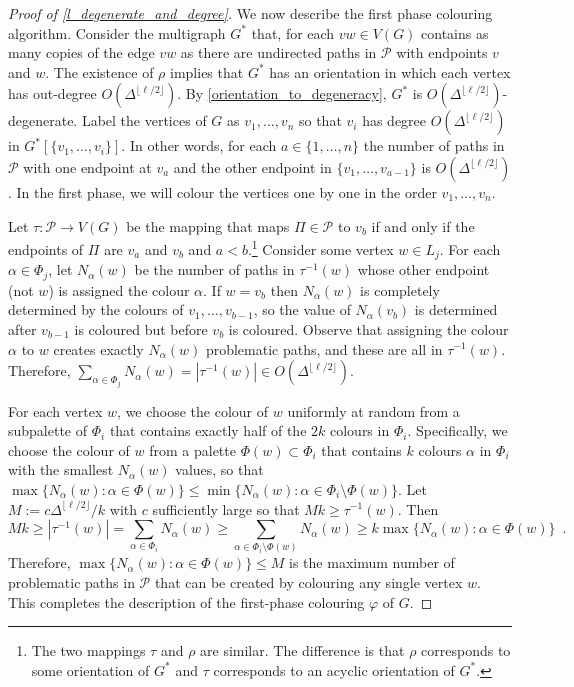 \documentclass{patmorin}
\begin{document}
\begin{proof}[Proof of \cref{l_degenerate_and_degree}]
  We now describe the first phase colouring algorithm.  Consider the multigraph $G^*$ that, for each $vw\in V(G)$ contains as many copies of the edge $vw$ as there are undirected paths in $\mathcal{P}$ with endpoints $v$ and $w$.  The existence of $\rho$ implies that $G^*$ has an orientation in which each vertex has out-degree $O(\Delta^{\lfloor\ell /2\rfloor})$.  By \cref{orientation_to_degeneracy}, $G^*$ is $O(\Delta^{\lfloor\ell /2\rfloor})$-degenerate.  Label the vertices of $G$ as $v_1,\ldots,v_n$ so that $v_i$ has degree $O(\Delta^{\lfloor\ell /2\rfloor})$ in $G^*[\{v_1,\ldots,v_{i}\}]$. In other words, for each $a\in\{1,\ldots,n\}$ the number of paths in $\mathcal{P}$ with one endpoint at $v_a$ and the other endpoint in $\{v_1,\ldots,v_{a-1}\}$ is $O(\Delta^{\lfloor\ell /2\rfloor})$.  In the first phase, we will colour the vertices one by one in the order $v_1,\ldots,v_n$.

  Let $\tau:\mathcal{P}\to V(G)$ be the mapping that maps $\Pi\in\mathcal{P}$ to $v_b$ if and only if the endpoints of $\Pi$ are $v_a$ and $v_b$ and $a < b$.\footnote{The two mappings $\tau$ and $\rho$ are similar. The difference is that $\rho$ corresponds to some orientation of $G^*$ and $\tau$ corresponds to an acyclic orientation of $G^*$.}  Consider some vertex $w\in L_j$.  For each $\alpha \in \Phi_j$, let $N_{\alpha}(w)$ be the number of paths in $\tau^{-1}(w)$ whose other endpoint (not $w$) is assigned the colour $\alpha$. If $w=v_b$ then $N_{\alpha}(w)$ is completely determined by the colours of $v_1,\ldots,v_{b-1}$, so the value of $N_\alpha(v_b)$ is determined after $v_{b-1}$ is coloured but before $v_b$ is coloured.  Observe that assigning the colour $\alpha$ to $w$ creates exactly $N_{\alpha}(w)$ problematic paths, and these are all in $\tau^{-1}(w)$.  Therefore, $\sum_{\alpha\in\Phi_j} N_\alpha(w)=|\tau^{-1}(w)|\in O(\Delta^{\lfloor\ell /2\rfloor})$.

  For each vertex $w$, we choose the colour of $w$ uniformly at random from a subpalette of $\Phi_i$ that contains exactly half of the $2k$ colours in $\Phi_i$.  Specifically, we choose the colour of $w$ from a palette $\Phi(w)\subset \Phi_i$ that contains $k$ colours $\alpha$ in $\Phi_i$ with the smallest $N_\alpha(w)$ values, so that  $\max\{N_\alpha(w):\alpha\in \Phi(w)\}\le\min\{N_\alpha(w):\alpha\in\Phi_i\setminus\Phi(w)\}$.  Let $M:=c\Delta^{\lfloor\ell/2\rfloor}/k$ with $c$ sufficiently large so that $Mk\ge \tau^{-1}(w)$.
  Then
  \[
    Mk \ge |\tau^{-1}(w)|= \sum_{\alpha\in \Phi_i} N_\alpha(w) \ge \sum_{\alpha\in\Phi_i\setminus\Phi(w)}N_\alpha(w) \ge k\max\{N_\alpha(w):\alpha\in \Phi(w)\} \enspace .
  \]
  Therefore, $\max\{N_\alpha(w):\alpha\in \Phi(w)\}\le M$ is the maximum number of problematic paths in $\mathcal{P}$ that can be created by colouring any single vertex $w$.  This completes the description of the first-phase colouring $\varphi$ of $G$.



\end{proof}
\end{document}
